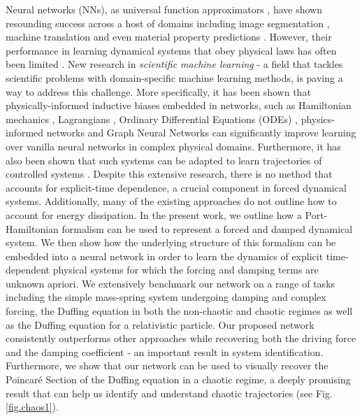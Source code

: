 \documentclass{article}
\begin{document}
Neural networks (NNs), as universal function approximators \cite{hornik_multilayer_1989}, have shown resounding success across a host of domains including image segmentation \cite{he_mask_2018}, machine translation \cite{devlin_bert_2019} and even material property predictions \cite{toussaint_differentiable_2018,yao_tensormol-01_2018}. However, their performance in learning dynamical systems that obey physical laws has often been limited \cite{greydanus_hamiltonian_2019,pukrittayakamee_simultaneous_2009}. New research in \textit{scientific machine learning} - a field that tackles scientific problems with domain-specific machine learning methods, is paving a way to address this challenge. More specifically, it has been shown that physically-informed inductive biases embedded in networks, such as Hamiltonian mechanics \cite{mattheakis_hamiltonian_2020, greydanus_hamiltonian_2019}, Lagrangians \cite{cranmer_lagrangian_2020, lutter_deep_2019}, Ordinary Differential Equations (ODEs) \cite{chen_neural_2018}, physics-informed networks \cite{raissi_physics_2017} and Graph Neural Networks \cite{battaglia_interaction_2016,sanchez-gonzalez_hamiltonian_2019} can significantly improve learning over vanilla neural networks in complex physical domains. Furthermore, it has also been shown that such systems can be adapted to learn trajectories of controlled systems \cite{lutter_deep_2019,zhong_dissipative_2020}. Despite this extensive research, there is no method that accounts for explicit-time dependence, a crucial component in forced dynamical systems. Additionally, many of the existing approaches do not outline how to account for energy dissipation. In the present work, we outline how a Port-Hamiltonian formalism can be used to represent a forced and damped dynamical system. We then show how the underlying structure of this formalism can be embedded into a neural network in order to learn the dynamics of explicit time-dependent physical systems for which the forcing and damping terms are unknown apriori. We extensively benchmark our network on a range of tasks including the simple mass-spring system undergoing damping and complex forcing, the Duffing equation in both the non-chaotic and chaotic regimes as well as the Duffing equation for a relativistic particle. Our proposed network consistently outperforms other approaches while recovering both the driving force and the damping coefficient - an important result in system identification. Furthermore, we show that our network can be used to visually recover the Poincar\'e Section of the Duffing equation in a chaotic regime, a deeply promising result that can help us identify and understand chaotic trajectories (see Fig. \ref{fig.chaos1}).
\end{document}
